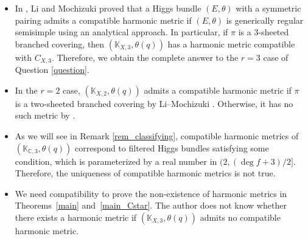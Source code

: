 \documentclass[10pt,a4paper]{amsart}
\numberwithin{equation}{section}
\newcommand{\C}{\mathbb{C}}
\begin{document}
{\samepage\begin{Remark}\quad
 \begin{itemize}\itemsep=0pt
 \item In \cite{LM1}, Li and Mochizuki proved that a Higgs bundle $(E,\theta)$ with a symmetric pairing admits a compatible harmonic metric if $(E,\theta)$ is generically regular semisimple using an analytical approach. In particular, if $\pi$ is a 3-sheeted branched covering, then $(\mathbb{K}_{X,3},\theta(q))$ has a harmonic metric compatible with $C_{X,3}$. Therefore, we obtain the complete answer to the $r=3$ case of Question \ref{question}.
 \item In the $r=2$ case, $(\mathbb{K}_{X,2},\theta(q))$ admits a compatible harmonic metric if $\pi$ is a two-sheeted branched covering by Li--Mochizuki \cite{LM1}. Otherwise, it has no such metric by \cite[Propositions~3.41 and~3.42]{LM3}.
 \item As we will see in Remark \ref{rem_classifying}, compatible harmonic metrics of $(\mathbb{K}_{\C,3},\theta(q))$ correspond to filtered Higgs bundles satisfying some condition, which is parameterized by a real number in $(2,(\deg{f}+3)/2]$. Therefore, the uniqueness of compatible harmonic metrics is not true.
 \item We need compatibility to prove the non-existence of harmonic metrics in Theorems~\ref{main} and~\ref{main_Cstar}. The author does not know whether there exists a harmonic metric if $(\mathbb{K}_{X,3},\theta(q))$ admits no compatible harmonic metric.
 \end{itemize}
\end{Remark}}
\end{document}
